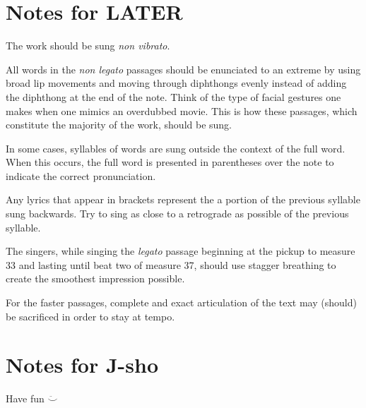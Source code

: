 \documentclass[a4paper]{book}
\begin{document}
\section*{Notes for LATER}
The work should be sung \emph{non vibrato}.\par
All words in the \emph{non legato} passages should be enunciated to an extreme by using broad lip movements and moving through diphthongs evenly instead of adding the diphthong at the end of the note.  Think of the type of facial gestures one makes when one mimics an overdubbed movie.  This is how these passages, which constitute the majority of the work, should be sung.\par
In some cases, syllables of words are sung outside the context of the full word.  When this occurs, the full word is presented in parentheses over the note to indicate the correct pronunciation.\par
Any lyrics that appear in brackets represent the a portion of the previous syllable sung backwards.  Try to sing as close to a retrograde as possible of the previous syllable.\par
The singers, while singing the \emph{legato} passage beginning at the pickup to measure 33 and lasting until beat two of measure 37, should use stagger breathing to create the smoothest impression possible.\par
For the faster passages, complete and exact articulation of the text may (should) be sacrificed in order to stay at tempo.\par
{}
\section*{Notes for J-sho}
Have fun $\ddot\smile$
\end{document}
